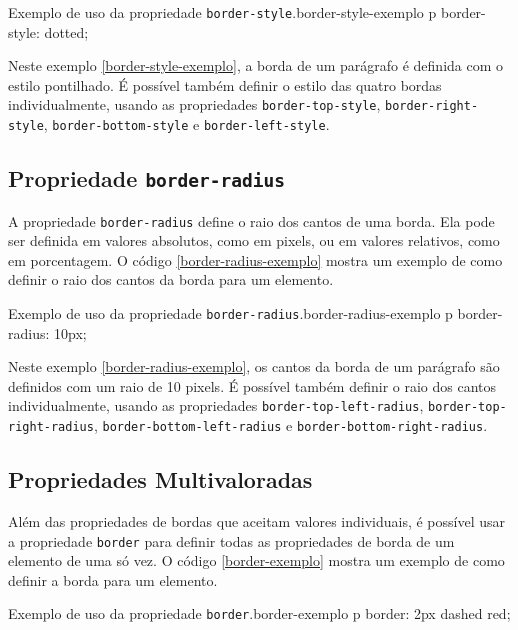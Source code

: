 \begin{csscode}{Exemplo de uso da propriedade \texttt{border-style}.}{border-style-exemplo}
p {
    border-style: dotted;
}
\end{csscode}

Neste exemplo \ref{border-style-exemplo}, a borda de um parágrafo é definida com o estilo pontilhado. É possível também definir o estilo das quatro bordas individualmente, usando as propriedades \texttt{border-top-style}, \texttt{border-right-style}, \texttt{border-bottom-style} e \texttt{border-left-style}.

\subsection{Propriedade \texttt{border-radius}}

A propriedade \texttt{border-radius} define o raio dos cantos de uma borda. Ela pode ser definida em valores absolutos, como em pixels, ou em valores relativos, como em porcentagem. O código \ref{border-radius-exemplo} mostra um exemplo de como definir o raio dos cantos da borda para um elemento.

\begin{csscode}{Exemplo de uso da propriedade \texttt{border-radius}.}{border-radius-exemplo}
p {
    border-radius: 10px;
}
\end{csscode}

Neste exemplo \ref{border-radius-exemplo}, os cantos da borda de um parágrafo são definidos com um raio de 10 pixels. É possível também definir o raio dos cantos individualmente, usando as propriedades \texttt{border-top-left-radius}, \texttt{border-top-right-radius}, \texttt{border-bottom-left-radius} e \texttt{border-bottom-right-radius}.

\subsection{Propriedades Multivaloradas}

Além das propriedades de bordas que aceitam valores individuais, é possível usar a propriedade \texttt{border} para definir todas as propriedades de borda de um elemento de uma só vez. O código \ref{border-exemplo} mostra um exemplo de como definir a borda para um elemento.

\begin{csscode}{Exemplo de uso da propriedade \texttt{border}.}{border-exemplo}
p {
    border: 2px dashed red;
}
\end{csscode}

